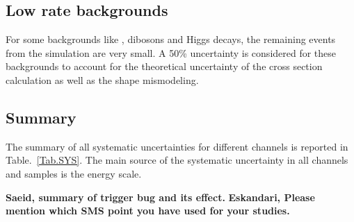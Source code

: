 \subsection{Low rate backgrounds} For some backgrounds like \ttbar, dibosons and Higgs decays, the remaining 
events from the simulation are very small. A 50\% uncertainty is considered for these backgrounds to account for the theoretical uncertainty of the
cross section calculation as well as the shape mismodeling.

\subsection{Summary}
The summary of all systematic uncertainties for different channels is reported in Table.~\ref{Tab.SYS}. The main source of the systematic uncertainty in all channels and samples is the \hadtau energy scale.



{\bf Saeid, summary of trigger bug and its effect.}
{\bf Eskandari, Please mention which SMS point you have used for your studies.}
